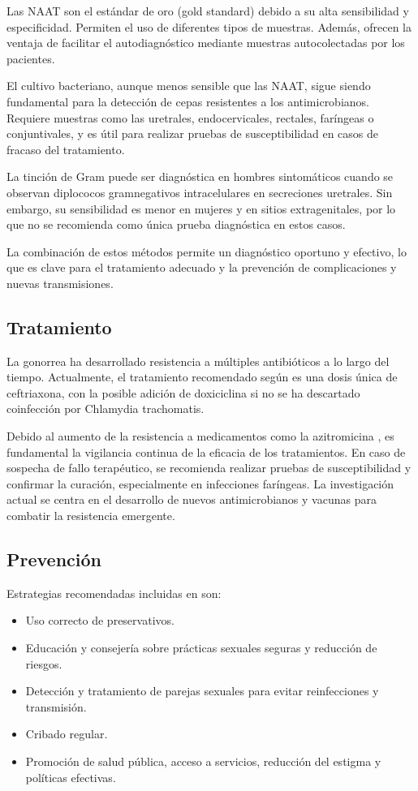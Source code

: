 Las NAAT son el estándar de oro (gold standard) debido a su alta sensibilidad y especificidad. Permiten el uso de diferentes tipos de muestras. Además, ofrecen la ventaja de facilitar el autodiagnóstico mediante muestras autocolectadas por los pacientes.

El cultivo bacteriano, aunque menos sensible que las NAAT, sigue siendo fundamental para la detección de cepas resistentes a los antimicrobianos. Requiere muestras como las uretrales, endocervicales, rectales, faríngeas o conjuntivales, y es útil para realizar pruebas de susceptibilidad en casos de fracaso del tratamiento.

La tinción de Gram puede ser diagnóstica en hombres sintomáticos cuando se observan diplococos gramnegativos intracelulares en secreciones uretrales. Sin embargo, su sensibilidad es menor en mujeres y en sitios extragenitales, por lo que no se recomienda como única prueba diagnóstica en estos casos.

La combinación de estos métodos permite un diagnóstico oportuno y efectivo, lo que es clave para el tratamiento adecuado y la prevención de complicaciones y nuevas transmisiones.

\subsection{Tratamiento}
La gonorrea ha desarrollado resistencia a múltiples antibióticos a lo largo del tiempo. Actualmente, el tratamiento recomendado según \cite{cyr2020update} es una dosis única de ceftriaxona, con la posible adición de doxiciclina si no se ha descartado coinfección por Chlamydia trachomatis.

Debido al aumento de la resistencia a medicamentos como la azitromicina \cite{unemo2019antimicrobial}, es fundamental la vigilancia continua de la eficacia de los tratamientos. En caso de sospecha de fallo terapéutico, se recomienda realizar pruebas de susceptibilidad y confirmar la curación, especialmente en infecciones faríngeas. La investigación actual se centra en el desarrollo de nuevos antimicrobianos y vacunas para combatir la resistencia emergente.

\subsection{Prevención}
Estrategias recomendadas incluidas en \cite{mayor2012diagnosis} son:
\begin{itemize}
    \item Uso correcto de preservativos.
    \item Educación y consejería sobre prácticas sexuales seguras y reducción de riesgos.
    \item Detección y tratamiento de parejas sexuales para evitar reinfecciones y transmisión. 
    \item Cribado regular.
    \item Promoción de salud pública, acceso a servicios, reducción del estigma y políticas efectivas.
\end{itemize}

